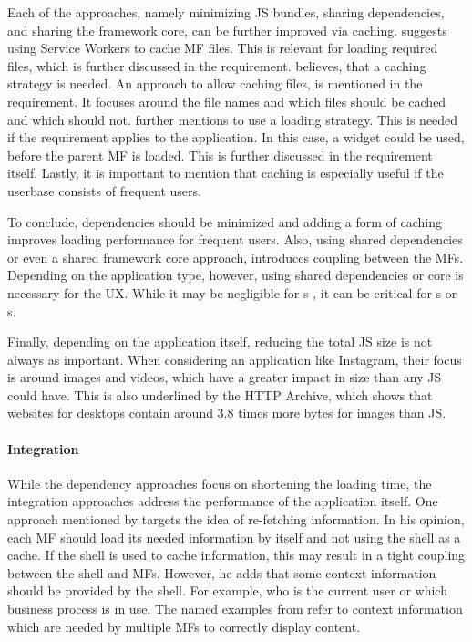 Each of the approaches, namely minimizing \ac{JS} bundles, sharing dependencies, and sharing the framework core, can be further improved via caching.
\textciteSteyer{} suggests using Service Workers to cache \ac{MF} files.
This is relevant for loading required files, which is further discussed in the \textit{} requirement.
\textciteRehm{} believes, that a caching strategy is needed.
An approach to allow caching files, is mentioned in the \textit{} requirement.
It focuses around the file names and which files should be cached and which should not.
\citeauthorRehm{} further mentions to use a loading strategy.
This is needed if the \textit{} requirement applies to the application.
In this case, a widget could be used, before the parent \ac{MF} is loaded.
This is further discussed in the requirement itself.
Lastly, it is important to mention that caching is especially useful if the userbase consists of frequent users.

To conclude, dependencies should be minimized and adding a form of caching improves loading performance for frequent users.
Also, using shared dependencies or even a shared framework core approach, introduces coupling between the \acp{MF}.
Depending on the application type, however, using shared dependencies or core is necessary for the \ac{UX}.
While it may be negligible for s \cite{Vogel.2020.Steyer}, it can be critical for s or s.

Finally, depending on the application itself, reducing the total \ac{JS} size is not always as important.
When considering an application like Instagram, their focus is around images and videos, which have a greater impact in size than any \ac{JS} could have.
This is also underlined by the \ac{HTTP} Archive, which shows that websites for desktops contain around 3.8 times more bytes for images than \ac{JS}\footnotemark{}.



\paragraph{Integration}

While the dependency approaches focus on shortening the loading time, the integration approaches address the performance of the application itself.
One approach mentioned by \textciteSteyer{} targets the idea of re-fetching information.
In his opinion, each \ac{MF} should load its needed information by itself and not using the shell as a cache.
If the shell is used to cache information, this may result in a tight coupling between the shell and \acp{MF}.
However, he adds that some context information should be provided by the shell.
For example, who is the current user or which business process is in use.
The named examples from \citeauthorSteyer{} refer to context information which are needed by multiple \acp{MF} to correctly display content.

